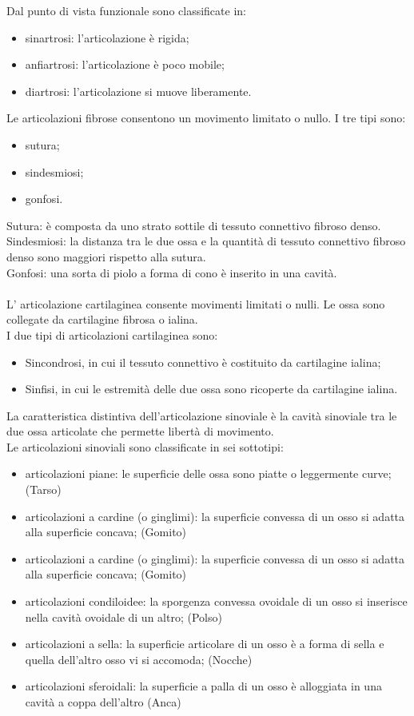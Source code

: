 \documentclass[a4paper]{article}
\begin{document}
Dal punto di vista funzionale sono classificate in:
\begin{itemize}
    \item sinartrosi: l’articolazione è rigida;
    \item anfiartrosi: l’articolazione è poco mobile;
    \item diartrosi: l’articolazione si muove liberamente.    
\end{itemize}

Le articolazioni fibrose consentono un movimento limitato o nullo.
I tre tipi sono:
\begin{itemize}
    \item sutura;
\item sindesmiosi;
\item gonfosi.
\end{itemize}
Sutura: è composta da uno strato sottile di tessuto connettivo fibroso denso. \\
Sindesmiosi: la distanza tra le due ossa e la quantità di tessuto connettivo fibroso denso sono maggiori
rispetto alla sutura. \\
Gonfosi: una sorta di piolo a forma di cono è inserito in una cavità. \\
\\
L’ articolazione cartilaginea consente movimenti limitati o nulli. Le ossa sono collegate da cartilagine
fibrosa o ialina.\\
I due tipi di articolazioni cartilaginea sono:
\begin{itemize}
    \item Sincondrosi, in cui il tessuto connettivo è costituito da cartilagine ialina;
    \item Sinfisi, in cui le estremità delle due ossa sono ricoperte da cartilagine ialina.    
\end{itemize}
La caratteristica distintiva dell’articolazione sinoviale è la cavità sinoviale tra le due ossa articolate che
permette libertà di movimento. \\
Le articolazioni sinoviali sono classificate in sei sottotipi:
\begin{itemize}
    \item articolazioni piane: le superficie delle ossa sono piatte o leggermente curve; (Tarso)
    \item articolazioni a cardine (o ginglimi): la superficie convessa di un osso si adatta alla superficie
    concava; (Gomito)
    \item articolazioni a cardine (o ginglimi): la superficie convessa di un osso si adatta alla superficie
    concava; (Gomito)
    \item articolazioni condiloidee: la sporgenza convessa ovoidale di un osso si inserisce nella cavità ovoidale
    di un altro; (Polso)
    \item articolazioni a sella: la superficie articolare di un osso è a forma di sella e quella dell’altro osso vi si
    accomoda; (Nocche)
    \item articolazioni sferoidali: la superficie a palla di un osso è alloggiata in una cavità a coppa dell’altro (Anca)
\end{itemize}
\end{document}

